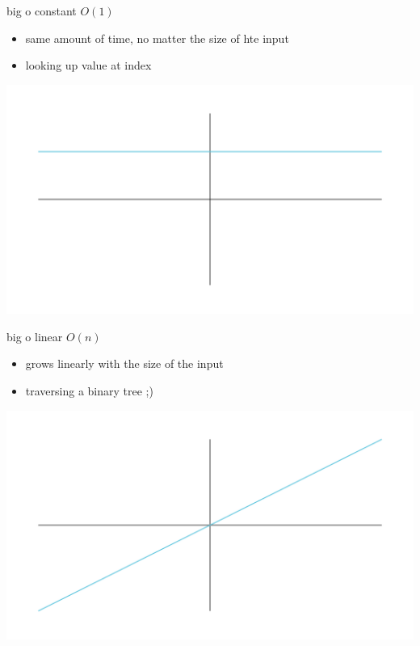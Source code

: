 \documentclass{beamer}
\begin{document}
	\begin{frame}{big o}
		constant $O(1)$
		\begin{itemize}
			\item[] same amount of time, no matter the size of hte input
			\item[] looking up value at index
		\end{itemize}
		\includegraphics[width=\linewidth,height=0.85\textheight,keepaspectratio]{../assets/constant-scale.png}	
	\end{frame}
	
	\begin{frame}{big o}
		linear $O(n)$
		\begin{itemize}
			\item[] grows linearly with the size of the input
			\item[] traversing a binary tree ;)
		\end{itemize}
		\includegraphics[width=\linewidth,height=0.85\textheight,keepaspectratio]{../assets/linear-scale.png}	
	\end{frame}
	
\end{document}
